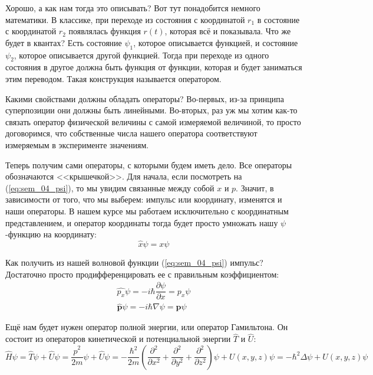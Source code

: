 \documentclass[12pt]{article}
\begin{document}
Хорошо, а как нам тогда это описывать? Вот тут понадобится немного математики. В классике, при переходе из состояния с координатой $r_1$ в состояние с координатой $r_2$ появлялась функция $r(t)$, которая всё и показывала. Что же будет в квантах? Есть состояние $\psi_1$, которое описывается функцией, и состояние $\psi_2$, которое описывается другой функцией. Тогда при переходе из одного состояния в другое должна быть функция от функции, которая и будет заниматься этим переводом. Такая конструкция называется оператором.

Какими свойствами должны обладать операторы? Во-первых, из-за принципа суперпозиции они должны быть линейными. Во-вторых, раз уж мы хотим как-то связать оператор физической величины с самой измеряемой величиной, то просто договоримся, что собственные числа нашего оператора соответствуют измеряемым в эксперименте значениям.

Теперь получим сами операторы, с которыми будем иметь дело. Все операторы обозначаются <<крышечкой>>. Для начала, если посмотреть на (\ref{eq:sem_04_psi}), то мы увидим связанные между собой $x$ и $p$. Значит, в зависимости от того, что мы выберем: импульс или координату, изменятся и наши операторы. В нашем курсе мы работаем исключительно с координатным представлением, и оператор координаты тогда будет просто умножать нашу $\psi$-функцию на координату:
\begin{equation}
\label{eq:sem_04_coordinate}
    \hat{x}\psi = x\psi
\end{equation}

Как получить из нашей волновой функции (\ref{eq:sem_04_psi}) импульс? Достаточно просто продифференцировать ее с правильным коэффициентом:
\begin{gather}
\label{eq:sem_04_momentum}
    \hat{p_x}\psi = -i\hbar\dfrac{\partial\psi}{\partial x} = p_x \psi\\
    \hat{\textbf{p}}\psi = -i\hbar\nabla\psi = \textbf{p} \psi
\end{gather}

Ещё нам будет нужен оператор полной энергии, или оператор Гамильтона. Он состоит из операторов кинетической и потенциальной энергии $\hat{T}$ и $\hat{U}$:
\begin{equation}
\label{eq:sem_04_hamilton}
    \hat{H}\psi = \hat{T}\psi + \hat{U}\psi = \dfrac{\hat{p}^2}{2m}\psi + \hat{U}\psi = -\dfrac{\hbar^2}{2m}\left(\dfrac{\partial^2}{\partial x^2} + \dfrac{\partial^2}{\partial y^2} + \dfrac{\partial^2}{\partial z^2}\right)\psi + U(x,y,z)\psi = -\hbar^2\Delta\psi + U(x,y,z)\psi
\end{equation}
\end{document}
